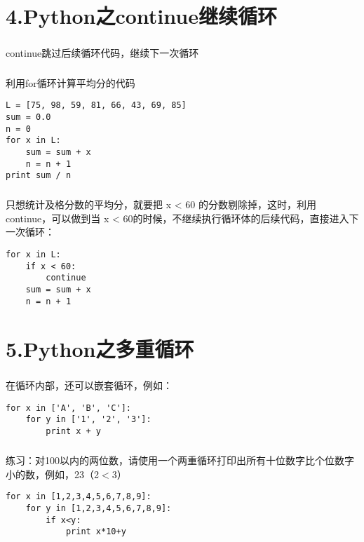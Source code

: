 \documentclass{article}
\begin{document}
\begin{CJK}{UTF8}{gbsn}
\section*{4.Python之continue继续循环}
\subparagraph*{}
continue跳过后续循环代码，继续下一次循环
\subparagraph*{}
利用for循环计算平均分的代码
\begin{verbatim}
L = [75, 98, 59, 81, 66, 43, 69, 85]
sum = 0.0
n = 0
for x in L:
    sum = sum + x
    n = n + 1
print sum / n
\end{verbatim}
\subparagraph*{}
只想统计及格分数的平均分，就要把 x < 60 的分数剔除掉，这时，利用 continue，可以做到当 x < 60的时候，不继续执行循环体的后续代码，直接进入下一次循环：
\begin{verbatim}
for x in L:
    if x < 60:
        continue
    sum = sum + x
    n = n + 1
\end{verbatim}
\section*{5.Python之多重循环}
\subparagraph*{}
在循环内部，还可以嵌套循环，例如：
\begin{verbatim}
for x in ['A', 'B', 'C']:
    for y in ['1', '2', '3']:
        print x + y
\end{verbatim}
\subparagraph*{}
练习：对100以内的两位数，请使用一个两重循环打印出所有十位数字比个位数字小的数，例如，23（2$<$3）
\begin{verbatim}
for x in [1,2,3,4,5,6,7,8,9]:
    for y in [1,2,3,4,5,6,7,8,9]:
        if x<y:
            print x*10+y
\end{verbatim}
\end{CJK}
\end{document}
